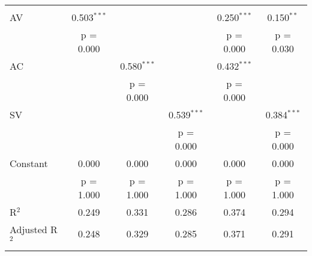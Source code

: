 
\begin{tabular}{@{\extracolsep{5pt}}lccccc} 
\\ 
\hline \\[-1.8ex] 
 AV & 0.503$^{***}$ &  &  & 0.250$^{***}$ & 0.150$^{**}$ \\ 
  & p = 0.000 &  &  & p = 0.000 & p = 0.030 \\ 
 AC &  & 0.580$^{***}$ &  & 0.432$^{***}$ &  \\ 
  &  & p = 0.000 &  & p = 0.000 &  \\ 
 SV &  &  & 0.539$^{***}$ &  & 0.384$^{***}$ \\ 
  &  &  & p = 0.000 &  & p = 0.000 \\ 
 Constant & 0.000 & 0.000 & 0.000 & 0.000 & 0.000 \\ 
  & p = 1.000 & p = 1.000 & p = 1.000 & p = 1.000 & p = 1.000 \\ 
R$^{2}$ & 0.249 & 0.331 & 0.286 & 0.374 & 0.294 \\ 
Adjusted R$^{2}$ & 0.248 & 0.329 & 0.285 & 0.371 & 0.291 \\ 
\hline \\[-1.8ex] 
\end{tabular} 
